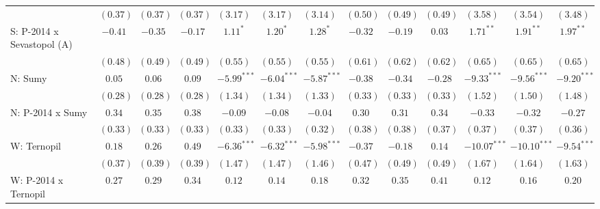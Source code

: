 \begin{table}
\begin{center}
\begin{tiny}
\begin{tabular}{l c c c c c c c c c c c c}
                            & $(0.37)$      & $(0.37)$     & $(0.37)$      & $(3.17)$       & $(3.17)$       & $(3.14)$       & $(0.50)$      & $(0.49)$    & $(0.49)$       & $(3.58)$       & $(3.54)$       & $(3.48)$       \\
S: P-2014 x Sevastopol (A)  & $-0.41$       & $-0.35$      & $-0.17$       & $1.11^{*}$     & $1.20^{*}$     & $1.28^{*}$     & $-0.32$       & $-0.19$     & $0.03$         & $1.71^{**}$    & $1.91^{**}$    & $1.97^{**}$    \\
                            & $(0.48)$      & $(0.49)$     & $(0.49)$      & $(0.55)$       & $(0.55)$       & $(0.55)$       & $(0.61)$      & $(0.62)$    & $(0.62)$       & $(0.65)$       & $(0.65)$       & $(0.65)$       \\
N: Sumy                     & $0.05$        & $0.06$       & $0.09$        & $-5.99^{***}$  & $-6.04^{***}$  & $-5.87^{***}$  & $-0.38$       & $-0.34$     & $-0.28$        & $-9.33^{***}$  & $-9.56^{***}$  & $-9.20^{***}$  \\
                            & $(0.28)$      & $(0.28)$     & $(0.28)$      & $(1.34)$       & $(1.34)$       & $(1.33)$       & $(0.33)$      & $(0.33)$    & $(0.33)$       & $(1.52)$       & $(1.50)$       & $(1.48)$       \\
N: P-2014 x Sumy            & $0.34$        & $0.35$       & $0.38$        & $-0.09$        & $-0.08$        & $-0.04$        & $0.30$        & $0.31$      & $0.34$         & $-0.33$        & $-0.32$        & $-0.27$        \\
                            & $(0.33)$      & $(0.33)$     & $(0.33)$      & $(0.33)$       & $(0.33)$       & $(0.32)$       & $(0.38)$      & $(0.38)$    & $(0.37)$       & $(0.37)$       & $(0.37)$       & $(0.36)$       \\
W: Ternopil                 & $0.18$        & $0.26$       & $0.49$        & $-6.36^{***}$  & $-6.32^{***}$  & $-5.98^{***}$  & $-0.37$       & $-0.18$     & $0.14$         & $-10.07^{***}$ & $-10.10^{***}$ & $-9.54^{***}$  \\
                            & $(0.37)$      & $(0.39)$     & $(0.39)$      & $(1.47)$       & $(1.47)$       & $(1.46)$       & $(0.47)$      & $(0.49)$    & $(0.49)$       & $(1.67)$       & $(1.64)$       & $(1.63)$       \\
W: P-2014 x Ternopil        & $0.27$        & $0.29$       & $0.34$        & $0.12$         & $0.14$         & $0.18$         & $0.32$        & $0.35$      & $0.41$         & $0.12$         & $0.16$         & $0.20$         \\

\end{tabular}
\end{tiny}
\end{center}
\end{table}
